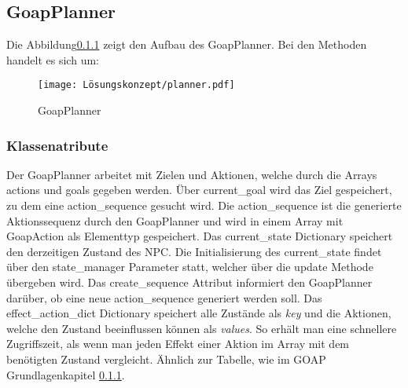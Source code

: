 \subsection{GoapPlanner}

Die Abbildung\ref{} zeigt den Aufbau des GoapPlanner. Bei den Methoden handelt es sich um: 

\begin{figure}[h]
  \centering
  \texttt{[image: Lösungskonzept/planner.pdf]}
	\captionsetup{justification=justified, format=plain}
  \caption{GoapPlanner}
  \label{fig:GoapPlanner}
\end{figure}

\subsubsection{Klassenatribute}

Der GoapPlanner arbeitet mit Zielen und Aktionen, welche durch die Arrays actions und goals gegeben werden. Über current\_goal wird das Ziel gespeichert, zu dem eine action\_sequence gesucht wird. Die action\_sequence ist die generierte Aktionssequenz durch den GoapPlanner und wird in einem Array mit GoapAction als Elementtyp gespeichert. Das current\_state Dictionary speichert den derzeitigen Zustand des NPC. Die Initialisierung des current\_state findet über den state\_manager Parameter statt, welcher über die update Methode übergeben wird. Das create\_sequence Attribut informiert den GoapPlanner darüber, ob eine neue action\_sequence generiert werden soll. Das effect\_action\_dict Dictionary speichert alle Zustände als \textit{key} und die Aktionen, welche den Zustand beeinflussen können als \textit{values}. So erhält man eine schnellere Zugriffszeit, als wenn man jeden Effekt einer Aktion im Array mit dem benötigten Zustand vergleicht. Ähnlich zur Tabelle, wie im GOAP Grundlagenkapitel \ref{}.


